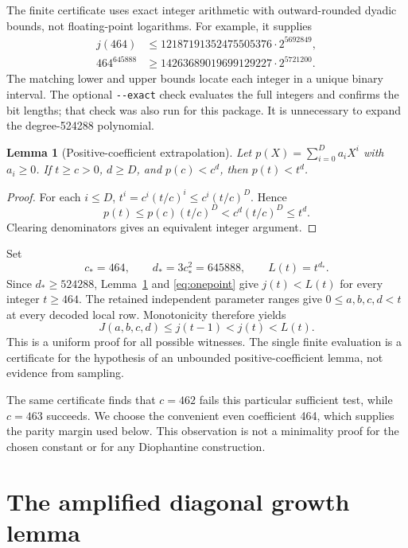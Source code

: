 \documentclass[11pt,a4paper]{article}
\newtheorem{lemma}[theorem]{Lemma}
\theoremstyle{definition}
\newcommand{\file}[1]{\nolinkurl{#1}}
\begin{document}
The finite certificate uses exact integer arithmetic with outward-rounded
dyadic bounds, not floating-point logarithms. For example, it supplies
\begin{align*}
 j(464)&\le 12187191352475505376\cdot2^{5692849},\\
 464^{645888}&\ge14263689019699129227\cdot2^{5721200}.
\end{align*}
The matching lower and upper bounds locate each integer in a unique binary
interval. The optional \file{--exact} check evaluates the full integers
and confirms the bit lengths; that check was also run for this package.
It is unnecessary to expand the degree-524288 polynomial.

\begin{lemma}[Positive-coefficient extrapolation]\label{lem:coeff}
Let $p(X)=\sum_{i=0}^{D}a_iX^i$ with $a_i\ge0$. If $t\ge c>0$,
$d\ge D$, and $p(c)<c^d$, then $p(t)<t^d$.
\end{lemma}
\begin{proof}
For each $i\le D$, $t^i=c^i(t/c)^i\le c^i(t/c)^D$. Hence
\[
 p(t)\le p(c)(t/c)^D<c^d(t/c)^D\le t^d.
\]
Clearing denominators gives an equivalent integer argument.
\end{proof}

Set
\begin{equation}\label{eq:ldef}
 c_*=464,\qquad d_*=3c_*^2=645888,\qquad L(t)=t^{d_*}.
\end{equation}
Since $d_*\ge524288$, Lemma~\ref{lem:coeff} and
\eqref{eq:onepoint} give $j(t)<L(t)$ for every integer $t\ge464$.
The retained independent parameter ranges give $0\le a,b,c,d<t$ at every
decoded local row. Monotonicity therefore yields
\begin{equation}\label{eq:alllabels}
 J(a,b,c,d)\le j(t-1)<j(t)<L(t).
\end{equation}
This is a uniform proof for all possible witnesses. The single finite
evaluation is a certificate for the hypothesis of an unbounded
positive-coefficient lemma, not evidence from sampling.

The same certificate finds that $c=462$ fails this particular sufficient
test, while $c=463$ succeeds. We choose the convenient even coefficient
464, which supplies the parity margin used below. This observation is
not a minimality proof for the chosen constant or for any Diophantine
construction.

\section{The amplified diagonal growth lemma}
\end{document}
